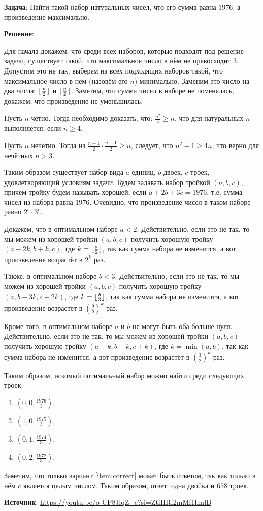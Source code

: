 \documentclass{article} %
\DeclarePairedDelimiter\ceil{\lceil}{\rceil}
\DeclarePairedDelimiter\floor{\lfloor}{\rfloor}
\begin{document}
\textbf{Задача}: Найти такой набор натуральных чисел, что его сумма равна $1976$, а произведение максимально.

\clearpage

\textbf{Решение}: 

Для начала докажем, что среди всех наборов, которые подходят под решение задачи, существует такой, что максимальное число в нём не превосходит $3$. Допустим это не так, выберем из всех подходящих наборов такой, что максимальное число в нём (назовём его $n$) минимально. Заменим это число на два числа: $\floor{\frac{n}{2}}$ и $\ceil{\frac{n}{2}}$. Заметим, что сумма чисел в наборе не поменялась, докажем, что произведение не уменьшилась.

Пусть $n$ чётно. Тогда необходимо доказать, что: $\frac{n^2}{4} \geqslant n$, что для натуральных $n$ выполняется, если $n \geqslant 4$.

Пусть $n$ нечётно. Тогда из $\frac{n - 1}{2} \cdot \frac{n + 1}{2} \geqslant n$, следует, что $n^2 - 1 \geqslant 4n$, что верно для нечётных $n > 3$.

Таким образом существует набор вида $a$ единиц, $b$ двоек, $c$ троек, удовлетворяющий условиям задачи. Будем задавать набор тройкой $(a, b, c)$, причём тройку будем называть хорошей, если $a + 2b + 3c = 1976$, т.е. сумма чисел из набора равна $1976$. Очевидно, что произведение чисел в таком наборе равно $2^b \cdot 3^c$.

Докажем, что в оптимальном наборе $a < 2$. Действительно, если это не так, то мы можем из хорошей тройки $(a, b, c)$ получить хорошую тройку $(a - 2k, b + k, c)$, где $k = \floor{\frac{a}{2}}$, так как сумма набора не изменится, а вот произведение возрастёт в $2^k$ раз.

Также, в оптимальном наборе $b < 3$. Действительно, если это не так, то мы можем из хорошей тройки $(a, b, c)$ получить хорошую тройку $(a, b - 3k, c + 2k)$, где $k = \floor{\frac{b}{3}}$, так как сумма набора не изменится, а вот произведение возрастёт в $\left( \frac{9}{8} \right)^k$ раз.

Кроме того, в оптимальном наборе $a$ и $b$ не могут быть оба больше нуля. Действительно, если это не так, то мы можем из хорошей тройки $(a, b, c)$ получить хорошую тройку $(a - k, b - k, c + k)$, где $k = \min(a,b)$, так как сумма набора не изменится, а вот произведение возрастёт в $\left( \frac{3}{2} \right)^k$ раз.

Таким образом, искомый оптимальный набор можно найти среди следующих троек:

\begin{enumerate}
  \item $(0, 0, \frac{1976}{3})$,
  \item $(1, 0, \frac{1975}{3})$,
  \item \label{item:correct} $(0, 1, \frac{1974}{3})$,
  \item $(0, 2, \frac{1972}{3})$.
\end{enumerate}

Заметим, что только вариант \ref{item:correct} может быть ответом, так как только в нём $c$ является целым числом. Таким образом, ответ: одна двойка и $658$ троек.  

\textbf{Источник}: \url{https://youtu.be/o-UF8JlqZ_c?si=ZtiHRf2mMf1lhalB}
\end{document}
